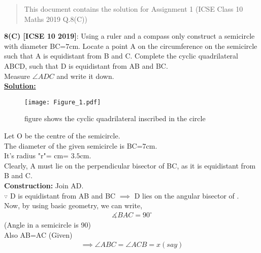 \documentclass[journal,12pt,twocolumn]{IEEEtran}
\begin{document}
\begin{abstract}
This document contains the solution for Assignment 1 (ICSE Class 10 Maths 2019 Q.8(C))
\end{abstract}










\begin{flushleft}
\textbf{8(C) [ICSE 10 2019]}: Using a ruler and a compass only construct a semicircle with diameter BC=$7$cm. Locate a point A on the circumference on the semicircle such that A is equidistant from B and C. Complete the cyclic quadrilateral ABCD, such that D is equidistant from AB and BC.\\ 
Measure $\angle{ADC}$ and write it down.\\

	\vspace{1cm}
	\textbf{\underline{Solution:}}
	
	     \begin{figure}[!ht]
        \centering
        \texttt{[image: Figure\_1.pdf]}
        \caption{figure shows the cyclic quadrilateral inscribed in the circle}
        \label{fig-1}
        \end{figure}
  
	Let O be the centre of the semicircle.\\
	
		The diameter of the given semicircle is BC=$7$cm.\\ 
	    It's radius "r"= cm= $3.5$cm.\\
	 
	    
	    Clearly, A must lie on the perpendicular bisector of BC, as it is equidistant from B and C.\\
	    \textbf{Construction:} Join AD.\\
	    $\because$ D is equidistant from AB and BC $\implies$ D lies on the angular bisector of . \\
	    Now, by using basic geometry, we can write,\\
	    \begin{align}\measuredangle{BAC}=90^{\circ}\end{align} (Angle in a semicircle is 90{\degree})\\
	   
	  Also AB=AC (Given)\\
	  \begin{align}{\implies} \angle{ABC}=\angle{ACB}=x(say)\end{align}\\
	  

\end{flushleft}
\end{document}
